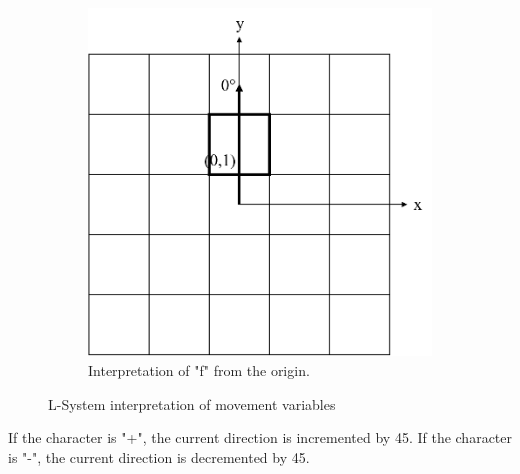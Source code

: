 \begin{figure}[H]
\begin{subfigure}[c]{0.4\textwidth}
		\includegraphics[width=\textwidth]{LSfsmall.png}
		\caption{Interpretation of "f" from the origin.}
	\end{subfigure}
	\caption{L-System interpretation of movement variables}
	\label{fig:lsmove}
\end{figure}

If the character is "+", the current direction is incremented by 45\textdegree. If the character is "-", the current direction is decremented by 45\textdegree.

